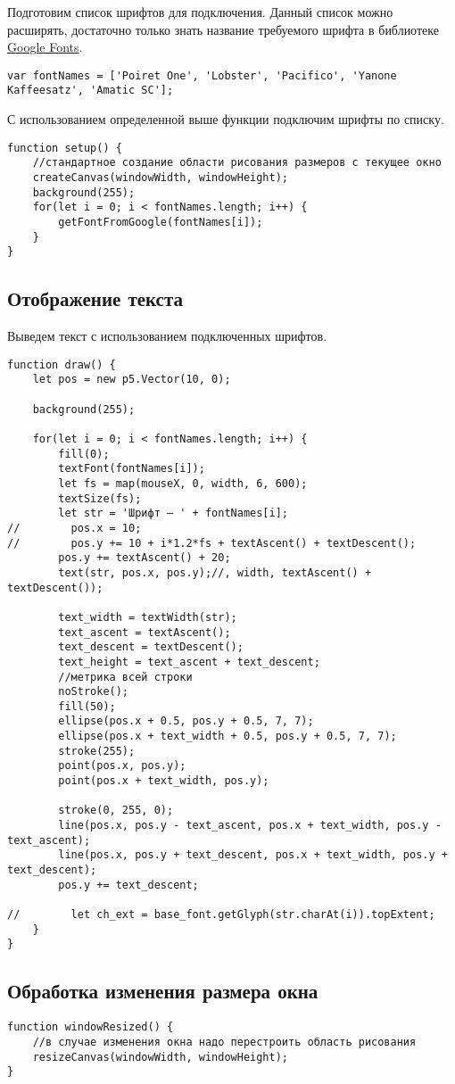 \documentclass[11pt]{scrartcl}
\begin{document}
Подготовим список шрифтов для подключения. Данный список можно расширять, достаточно только знать название требуемого шрифта в библиотеке \href{https://fonts.google.com/}{Google Fonts}.

\begin{verbatim}
var fontNames = ['Poiret One', 'Lobster', 'Pacifico', 'Yanone Kaffeesatz', 'Amatic SC'];
\end{verbatim}

С использованием определенной выше функции подключим шрифты по списку.

\begin{verbatim}
function setup() {
    //стандартное создание области рисования размеров с текущее окно
    createCanvas(windowWidth, windowHeight);
    background(255);
    for(let i = 0; i < fontNames.length; i++) {
        getFontFromGoogle(fontNames[i]);
    }
}
\end{verbatim}

\subsection{Отображение текста}
\label{sec:org25c3baa}

Выведем текст с использованием подключенных шрифтов.

\begin{verbatim}
function draw() {
    let pos = new p5.Vector(10, 0);

    background(255);

    for(let i = 0; i < fontNames.length; i++) {
        fill(0);
        textFont(fontNames[i]);
        let fs = map(mouseX, 0, width, 6, 600);
        textSize(fs);
        let str = 'Шрифт — ' + fontNames[i];
//        pos.x = 10;
//        pos.y += 10 + i*1.2*fs + textAscent() + textDescent();
        pos.y += textAscent() + 20;
        text(str, pos.x, pos.y);//, width, textAscent() + textDescent());

        text_width = textWidth(str);
        text_ascent = textAscent();
        text_descent = textDescent();
        text_height = text_ascent + text_descent;
        //метрика всей строки
        noStroke();
        fill(50);
        ellipse(pos.x + 0.5, pos.y + 0.5, 7, 7);
        ellipse(pos.x + text_width + 0.5, pos.y + 0.5, 7, 7);
        stroke(255);
        point(pos.x, pos.y);
        point(pos.x + text_width, pos.y);

        stroke(0, 255, 0);
        line(pos.x, pos.y - text_ascent, pos.x + text_width, pos.y - text_ascent);
        line(pos.x, pos.y + text_descent, pos.x + text_width, pos.y + text_descent);
        pos.y += text_descent;

//        let ch_ext = base_font.getGlyph(str.charAt(i)).topExtent;
    }
}
\end{verbatim}

\subsection{Обработка изменения размера окна}
\label{sec:org35775f4}

\begin{verbatim}
function windowResized() {
    //в случае изменения окна надо перестроить область рисования
    resizeCanvas(windowWidth, windowHeight);
}
\end{verbatim}
\end{document}
